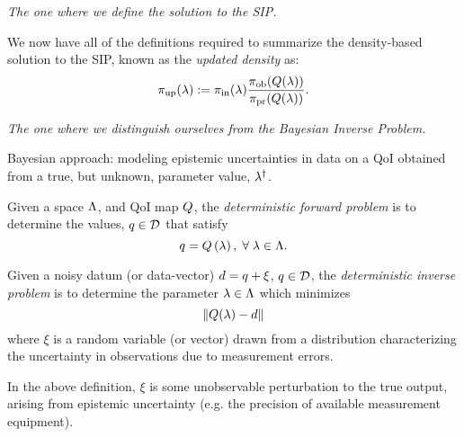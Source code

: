 \begin{frame}[t]{\it The one where we define the solution to the SIP.}

We now have all of the definitions required to summarize the density-based solution to the SIP, known as the \emph{updated density} as:
\vskip 10pt
\begin{equation}\label{eq:updated-pdf}
	\operatorname*{\pi_{up}}(\lambda) := \operatorname*{\pi_{in}}(\lambda)\frac{\operatorname*{\pi_{ob}}(Q(\lambda))}{\operatorname*{\pi_{pr}}(Q(\lambda))}.
\end{equation}

\end{frame}


\begin{frame}[t]{\it The one where we distinguish ourselves from the Bayesian Inverse Problem.}

Bayesian approach: modeling epistemic uncertainties in data on a QoI obtained from a true, but unknown, parameter value, $\lambda^\dagger$.

\vskip 10pt

\begin{defn}
  Given a space ${\Lambda}$, and QoI map $Q$, the \emph{deterministic forward problem} is to determine the values, $q \in \mathcal{D}$ that satisfy
  \begin{equation}
    q = Q\left ( \lambda \right ), \; \forall \; \lambda \in {\Lambda}.
  \end{equation}
\end{defn}


\end{frame}


\begin{frame}[t]
\begin{defn}
  Given a noisy datum (or data-vector) $d = q + \xi$, $q \in \mathcal{D}$, the \emph{deterministic inverse problem} is to determine the parameter $\lambda \in {\Lambda}$ which minimizes
  \begin{equation}
    \left\Vert Q(\lambda) - d\right\Vert
  \end{equation}
  where $\xi$ is a random variable (or vector) drawn from a distribution characterizing the uncertainty in observations due to measurement errors.
\end{defn}

In the above definition, $\xi$ is some unobservable perturbation to the true output, arising from epistemic uncertainty (e.g. the precision of available measurement equipment).

\end{frame}


